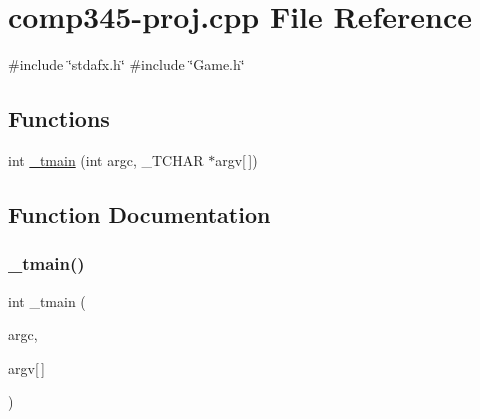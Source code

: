 \hypertarget{comp345-proj_8cpp}{}\section{comp345-\/proj.cpp File Reference}
\label{comp345-proj_8cpp}
{\ttfamily \#include \char`\"{}stdafx.\+h\char`\"{}}\newline
{\ttfamily \#include \char`\"{}Game.\+h\char`\"{}}\newline
\subsection*{Functions}
\begin{DoxyCompactItemize}
\item 
int \hyperlink{comp345-proj_8cpp_a353674c5af92be7fb389265cde4e5e03}{\+\_\+tmain} (int argc, \+\_\+\+T\+C\+H\+AR $\ast$argv\mbox{[}$\,$\mbox{]})
\end{DoxyCompactItemize}


\subsection{Function Documentation}
\mbox{\label{comp345-proj_8cpp_a353674c5af92be7fb389265cde4e5e03}} 
\subsubsection{\texorpdfstring{\+\_\+tmain()}{\_tmain()}}
{\footnotesize\ttfamily int \+\_\+tmain (\begin{DoxyParamCaption}\item[{int}]{argc,  }\item[{\+\_\+\+T\+C\+H\+AR $\ast$}]{argv\mbox{[}$\,$\mbox{]} }\end{DoxyParamCaption})}

